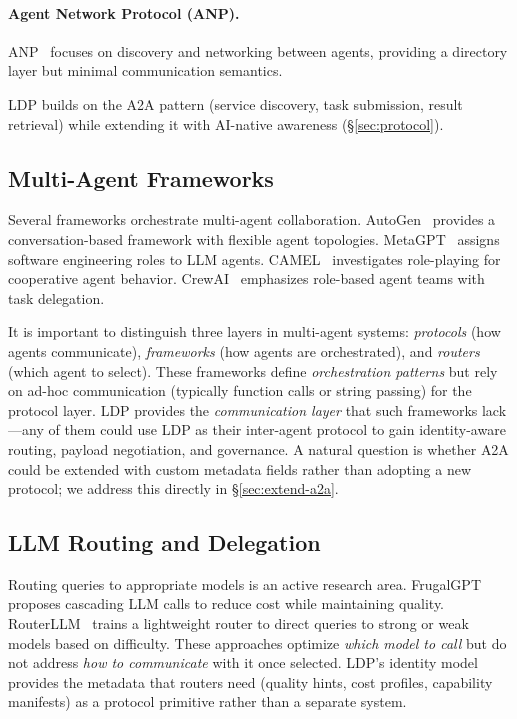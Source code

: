 \documentclass[11pt,a4paper]{article}
\newcommand{\ldp}{\textsc{LDP}}
\newcommand{\atoa}{\textsc{A2A}}
\begin{document}
\paragraph{Agent Network Protocol (ANP).} ANP~\citep{anp2024} focuses on discovery and networking between agents, providing a directory layer but minimal communication semantics.

\ldp{} builds on the \atoa{} pattern (service discovery, task submission, result retrieval) while extending it with AI-native awareness (\S\ref{sec:protocol}).

\subsection{Multi-Agent Frameworks}

Several frameworks orchestrate multi-agent collaboration. AutoGen~\citep{wu2023autogen} provides a conversation-based framework with flexible agent topologies. MetaGPT~\citep{hong2023metagpt} assigns software engineering roles to LLM agents. CAMEL~\citep{li2023camel} investigates role-playing for cooperative agent behavior. CrewAI~\citep{crewai2024} emphasizes role-based agent teams with task delegation.

It is important to distinguish three layers in multi-agent systems: \emph{protocols} (how agents communicate), \emph{frameworks} (how agents are orchestrated), and \emph{routers} (which agent to select). These frameworks define \emph{orchestration patterns} but rely on ad-hoc communication (typically function calls or string passing) for the protocol layer. \ldp{} provides the \emph{communication layer} that such frameworks lack---any of them could use \ldp{} as their inter-agent protocol to gain identity-aware routing, payload negotiation, and governance. A natural question is whether \atoa{} could be extended with custom metadata fields rather than adopting a new protocol; we address this directly in \S\ref{sec:extend-a2a}.

\subsection{LLM Routing and Delegation}

Routing queries to appropriate models is an active research area. FrugalGPT~\citep{chen2023frugalgpt} proposes cascading LLM calls to reduce cost while maintaining quality. RouterLLM~\citep{ong2024routerllm} trains a lightweight router to direct queries to strong or weak models based on difficulty. These approaches optimize \emph{which model to call} but do not address \emph{how to communicate} with it once selected. \ldp{}'s identity model provides the metadata that routers need (quality hints, cost profiles, capability manifests) as a protocol primitive rather than a separate system.
\end{document}
